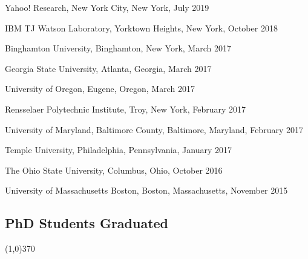 \documentclass[10pt]{article}
\newenvironment{myindentpar}[1]%
{\begin{list}{}%
         {\setlength{\leftmargin}{#1}}%
         \item[]%
}
{\end{list}}
\newcounter{list}
\begin{document}
\begin{myindentpar}{0.75cm}
\hspace{-0.75cm} Yahoo! Research, New York City, New York, July 2019

\hspace{-0.75cm} IBM TJ Watson Laboratory, Yorktown Heights, New York, October 2018
	




\hspace{-0.75cm} Binghamton University, Binghamton, New York, March 2017

\hspace{-0.75cm} Georgia State University, Atlanta, Georgia, March 2017

\hspace{-0.75cm} University of Oregon, Eugene, Oregon, March 2017

\hspace{-0.75cm} Rensselaer Polytechnic Institute, Troy, New York, February 2017

\hspace{-0.75cm} University of Maryland, Baltimore County, Baltimore, Maryland, February 2017

\hspace{-0.75cm} Temple University, Philadelphia, Pennsylvania, January 2017

\hspace{-0.75cm} The Ohio State University, Columbus, Ohio, October 2016

\hspace{-0.75cm} University of Massachusetts Boston, Boston, Massachusetts, November 2015

\end{myindentpar}

\subsection{\sc PhD Students Graduated}
\vspace{-0.4cm} \line(1,0){370} \vspace{-0.1cm}
\end{document}
